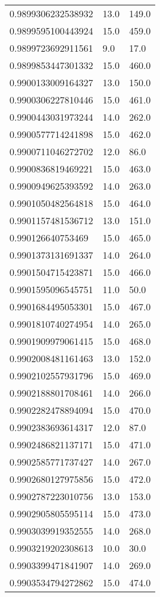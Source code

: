 \begin{center}
\begin{supertabular}[H]{p{0.30\textwidth}p{0.05\textwidth}p{0.05\textwidth}}
0.9899306232538932 & 13.0 & 149.0 \\ 
0.9899595100443924 & 15.0 & 459.0 \\ 
0.9899723692911561 & 9.0 & 17.0 \\ 
0.9899853447301332 & 15.0 & 460.0 \\ 
0.9900133009164327 & 13.0 & 150.0 \\ 
0.9900306227810446 & 15.0 & 461.0 \\ 
0.9900443031973244 & 14.0 & 262.0 \\ 
0.9900577714241898 & 15.0 & 462.0 \\ 
0.9900711046272702 & 12.0 & 86.0 \\ 
0.9900836819469221 & 15.0 & 463.0 \\ 
0.9900949625393592 & 14.0 & 263.0 \\ 
0.9901050482564818 & 15.0 & 464.0 \\ 
0.9901157481536712 & 13.0 & 151.0 \\ 
0.990126640753469 & 15.0 & 465.0 \\ 
0.9901373131691337 & 14.0 & 264.0 \\ 
0.9901504715423871 & 15.0 & 466.0 \\ 
0.9901595096545751 & 11.0 & 50.0 \\ 
0.9901684495053301 & 15.0 & 467.0 \\ 
0.9901810740274954 & 14.0 & 265.0 \\ 
0.9901909979061415 & 15.0 & 468.0 \\ 
0.9902008481161463 & 13.0 & 152.0 \\ 
0.9902102557931796 & 15.0 & 469.0 \\ 
0.9902188801708461 & 14.0 & 266.0 \\ 
0.9902282478894094 & 15.0 & 470.0 \\ 
0.9902383693614317 & 12.0 & 87.0 \\ 
0.9902486821137171 & 15.0 & 471.0 \\ 
0.9902585771737427 & 14.0 & 267.0 \\ 
0.9902680127975856 & 15.0 & 472.0 \\ 
0.9902787223010756 & 13.0 & 153.0 \\ 
0.9902905805595114 & 15.0 & 473.0 \\ 
0.9903039919352555 & 14.0 & 268.0 \\ 
0.9903219202308613 & 10.0 & 30.0 \\ 
0.9903399471841907 & 14.0 & 269.0 \\ 
0.9903534794272862 & 15.0 & 474.0 \\ 

\end{supertabular}
\end{center}

